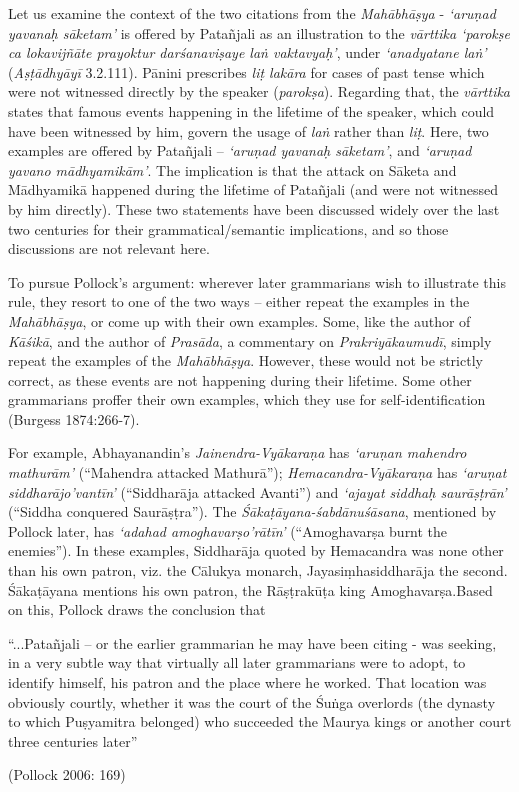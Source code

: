 Let us examine the context of the two citations from the {\sl Mahābhāṣya} - {\sl `aruṇad yavanaḥ sāketam'} is offered by Patañjali as an illustration to the {\sl vārttika `parokṣe ca lokavijñāte prayoktur darśanaviṣaye laṅ vaktavyaḥ'}, under {\sl `anadyatane laṅ'} ({\sl Aṣṭādhyāyī} 3.2.111). Pānini prescribes {\sl liṭ lakāra} for cases of past tense which were not witnessed directly by the speaker ({\sl parokṣa}). Regarding that, the {\sl vārttika} states that famous events happening in the lifetime of the speaker, which could have been witnessed by him, govern the usage of {\sl laṅ} rather than {\sl liṭ}. Here, two examples are offered by Patañjali -- {\sl `aruṇad yavanaḥ sāketam'}, and {\sl `aruṇad yavano mādhyamikām'}. The implication is that the attack on Sāketa and Mādhyamikā happened during the lifetime of Patañjali (and were not witnessed by him directly). These two statements have been discussed widely over the last two centuries for their grammatical/semantic implications, and so those discussions are not relevant here.

To pursue Pollock's argument: wherever later grammarians wish to illustrate this rule, they resort to one of the two ways -- either repeat the examples in the {\sl Mahābhāṣya}, or come up with their own examples. Some, like the author of {\sl Kāśikā}, and the author of {\sl Prasāda}, a commentary on {\sl Prakriyākaumudī}, simply repeat the examples of the {\sl Mahābhāṣya}. However, these would not be strictly correct, as these events are not happening during their lifetime. Some other grammarians proffer their own examples, which they use for self-identification (Burgess 1874:266-7).

For example, Abhayanandin's {\sl Jainendra-Vyākaraṇa} has {\sl `aruṇan mahendro mathurām'} (``Mahendra attacked Mathurā''); {\sl Hemacandra-Vyākaraṇa} has {\sl `aruṇat siddharājo’vantīn'} (``Siddharāja attacked Avanti'') and {\sl `ajayat siddhaḥ saurāṣṭrān'} (``Siddha conquered Saurāṣṭra''). The {\sl Śākaṭāyana-śabdānuśāsana}, mentioned by Pollock later, has {\sl `adahad amoghavarṣo'\-rātīn'} (``Amoghavarṣa burnt the enemies''). In these examples, Siddharāja quoted by Hemacandra was none other than his own patron, viz. the Cālukya monarch, Jayasiṃhasiddharāja the second. Śākaṭā\-yana mentions his own patron, the Rāṣṭrakūṭa king Amoghavarṣa.\break Based on this, Pollock draws the conclusion that 
\begin{myquote}
``...Patañjali -- or the earlier grammarian he may have been citing - was seeking, in a very subtle way that virtually all later grammarians were to adopt, to identify himself, his patron and the place where he worked. That location was obviously courtly, whether it was the court of the Śuṅga overlords (the dynasty to which Puṣyamitra belonged) who succeeded the Maurya kings or another court three centuries later''

\hfill (Pollock 2006: 169)
\end{myquote}

